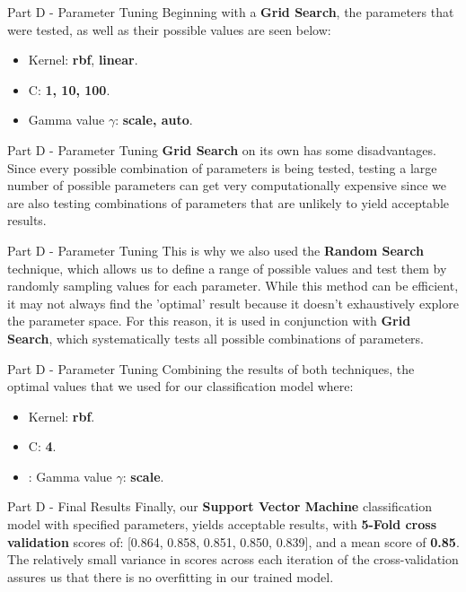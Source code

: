 \documentclass{beamer}
\begin{document}
    \begin{frame}{Part D - Parameter Tuning}
    Beginning with a \textbf{Grid Search}, the parameters that were tested, as well as their possible values are seen below:
    \begin{itemize}
        \item Kernel: \textbf{rbf}, \textbf{linear}.
        \item C: \textbf{1, 10, 100}.
        \item Gamma value $\gamma$: \textbf{scale, auto}.
    \end{itemize}
    \end{frame}

    \begin{frame}{Part D - Parameter Tuning}
    \textbf{Grid Search} on its own has some disadvantages. Since every possible combination of parameters is being tested,
    testing a large number of possible parameters can get very computationally expensive since we are also testing combinations
    of parameters that are unlikely to yield acceptable results.
    \end{frame}

    \begin{frame}{Part D - Parameter Tuning}
    This is why we also used the \textbf{Random Search} technique, which allows us to define a range of possible values and 
    test them by randomly sampling values for each parameter. While this method can be efficient, it may not always find the
    'optimal' result because it doesn't exhaustively explore the parameter space. For this reason, it is used in conjunction with 
    \textbf{Grid Search}, which systematically tests all possible combinations of parameters.
    \end{frame}

    \begin{frame}{Part D - Parameter Tuning}
    Combining the results of both techniques, the optimal values that we used for our classification model where:
    \begin{itemize}
        \item Kernel: \textbf{rbf}.
        \item C: \textbf{4}.
        \item: Gamma value $\gamma$: \textbf{scale}.
    \end{itemize}
    \end{frame}

    \begin{frame}{Part D - Final Results}
    Finally, our \textbf{Support Vector Machine} classification model with specified parameters, yields acceptable results, with
    \textbf{5-Fold cross validation} scores of: [0.864, 0.858, 0.851, 0.850, 0.839], and a mean score of \textbf{0.85}.
    The relatively small variance in scores across each iteration of the cross-validation assures us that there is no
    overfitting in our trained model.
    \end{frame}
    
\end{document}
